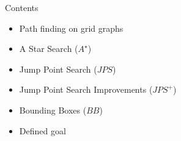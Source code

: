 \documentclass{presentation}
\begin{document}
\begin{frame}
    \titlepage
\end{frame}



\begin{frame}{Contents}
    \begin{itemize}
        \item Path finding on grid graphs
        \item A Star Search ($A^\star$)
        \item Jump Point Search ($JPS$)
        \item Jump Point Search Improvements ($JPS^+$)
        \item Bounding Boxes ($BB$)
        \item Defined goal
    \end{itemize}
\end{frame}



\begin{frame}
\end{frame}
\end{document}
